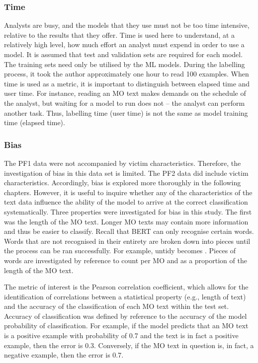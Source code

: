  \subsubsection{Time} Analysts are busy, and the models that they use must not be too time intensive, relative to the results that they offer. Time is used here to understand, at a relatively high level, how much effort an analyst must expend in order to use a model. It is assumed that test and validation sets are required for each model. The training sets need only be utilised by the ML models. During the labelling process, it took the author approximately one hour to read 100 examples. When time is used as a metric, it is important to distinguish between elapsed time and user time. For instance, reading an MO text makes demands on the schedule of the analyst, but waiting for a model to run does not – the analyst can perform another task. Thus, labelling time (user time) is not the same as model training time (elapsed time).
 
\subsubsection{Bias} \label{study1-bias}The PF1 data were not accompanied by victim characteristics. Therefore, the investigation of bias in this data set is limited. The PF2 data did include victim characteristics. Accordingly, bias is explored more thoroughly in the following chapters. However, it is useful to inquire whether any of the characteristics of the text data influence the ability of the model to arrive at the correct classification systematically. Three properties were investigated for bias in this study. The first was the length of the MO text. Longer MO texts may contain more information and thus be easier to classify. Recall that BERT can only recognise certain words. Words that are not recognised in their entirety are broken down into pieces until the process can be ran successfully. For example, untidy becomes .  Pieces of words are investigated by reference to count per MO and as a proportion of the length of the MO text.

The metric of interest is the Pearson correlation coefficient, which allows for the identification of correlations between a statistical property (e.g., length of text) and the accuracy of the classification of each MO text within the test set. Accuracy of classification was defined by reference to the accuracy of the model probability of classification. For example, if the model predicts that an MO text is a positive example with probability of 0.7 and the text is in fact a positive example, then the error is 0.3. Conversely, if the MO text in question is, in fact, a negative example, then the error is 0.7.

